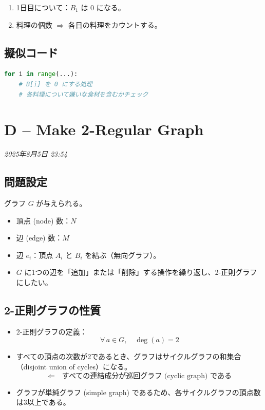 \documentclass[a4paper,11pt]{ltjsarticle}
\begin{document}
\begin{enumerate}
  \item 1日目について：$B_1$ は 0 になる。
  \item 料理の個数 $\Rightarrow$ 各日の料理をカウントする。
\end{enumerate}

\subsection{擬似コード}

\begin{lstlisting}[language=Python]
for i in range(...):
    # B[i] を 0 にする処理
    # 各料理について嫌いな食材を含むかチェック
\end{lstlisting}

\newpage

\section{D -- Make 2-Regular Graph}
\begin{flushright}
\textit{2025年8月5日 23:54}
\end{flushright}

\subsection{問題設定}

グラフ $G$ が与えられる。
\begin{itemize}
  \item 頂点 (node) 数：$N$
  \item 辺 (edge) 数：$M$
  \item 辺 $e_i$：頂点 $A_i$ と $B_i$ を結ぶ（無向グラフ）。
  \item $G$ に1つの辺を「追加」または「削除」する操作を繰り返し、2-正則グラフにしたい。
\end{itemize}

\subsection{2-正則グラフの性質}

\begin{itemize}
  \item 2-正則グラフの定義：
    \[
      \forall\, a \in G,\quad \deg(a) = 2
    \]
  \item すべての頂点の次数が2であるとき、グラフはサイクルグラフの和集合（disjoint union of cycles）になる。
    \[
      \Leftarrow\quad \text{すべての連結成分が巡回グラフ (cyclic graph) である}
    \]
  \item グラフが単純グラフ (simple graph) であるため、各サイクルグラフの頂点数は3以上である。
\end{itemize}
\end{document}
